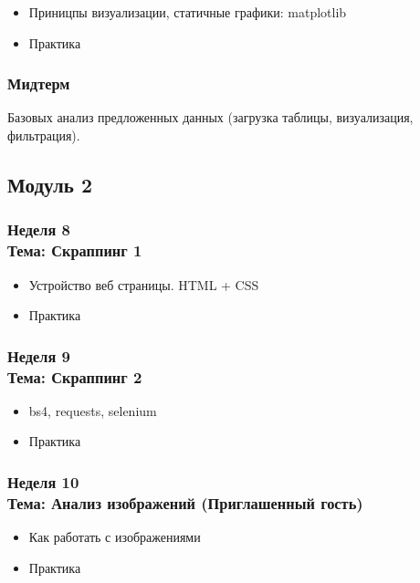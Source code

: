 \documentclass[a4paper,11pt]{article}
\begin{document}
\begin{itemize}
    \item Приницпы визуализации, статичные графики: matplotlib
    \item Практика
\end{itemize}


\subsubsection{Мидтерм}
Базовых анализ предложенных данных (загрузка таблицы, визуализация, фильтрация).

\subsection{Модуль 2}


\subsubsection{Неделя 8\\ Тема: Скраппинг 1}

\begin{itemize}
    \item Устройство веб страницы. HTML + CSS
    \item Практика
\end{itemize}

\subsubsection{Неделя 9\\ Тема: Скраппинг 2}

\begin{itemize}
    \item bs4, requests, selenium
    \item Практика
\end{itemize}

\subsubsection{Неделя 10\\ Тема: Анализ изображений (Приглашенный гость)} 

\begin{itemize}
    \item Как работать с изображениями 
    \item Практика
\end{itemize}
\end{document}
